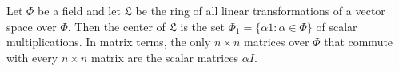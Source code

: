 Let $\Phi$ be a field and let $\mathfrak{L}$ be the ring of all linear transformations of a vector space over $\Phi$. Then the center of $\mathfrak{L}$ is the set $\Phi_1 = \{\alpha 1 : \alpha \in \Phi\}$ of scalar multiplications. In matrix terms, the only $n \times n$ matrices over $\Phi$ that commute with every $n \times n$ matrix are the scalar matrices $\alpha I$.
